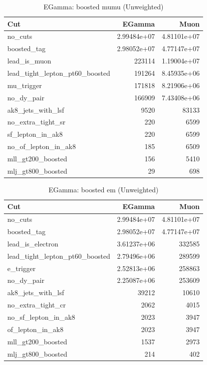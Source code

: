 \documentclass{article}
\begin{document}
\begin{table}[htbp]
\centering
\caption{EGamma: boosted mumu (Unweighted)}
\begin{tabular}{lrr}
\hline
Cut & EGamma & Muon \\
\hline
no\_cuts & 2.99484e+07 & 4.81101e+07 \\
boosted\_tag & 2.98052e+07 & 4.77147e+07 \\
lead\_is\_muon & 223114 & 1.19004e+07 \\
lead\_tight\_lepton\_pt60\_boosted & 191264 & 8.45935e+06 \\
mu\_trigger & 171818 & 8.21906e+06 \\
no\_dy\_pair & 166909 & 7.43408e+06 \\
ak8\_jets\_with\_lsf & 9520 & 83133 \\
no\_extra\_tight\_sr & 220 & 6599 \\
sf\_lepton\_in\_ak8 & 220 & 6599 \\
no\_of\_lepton\_in\_ak8 & 185 & 6509 \\
mll\_gt200\_boosted & 156 & 5410 \\
mlj\_gt800\_boosted & 29 & 698 \\
\hline
\end{tabular}
\end{table}

\begin{table}[htbp]
\centering
\caption{EGamma: boosted em (Unweighted)}
\begin{tabular}{lrr}
\hline
Cut & EGamma & Muon \\
\hline
no\_cuts & 2.99484e+07 & 4.81101e+07 \\
boosted\_tag & 2.98052e+07 & 4.77147e+07 \\
lead\_is\_electron & 3.61237e+06 & 332585 \\
lead\_tight\_lepton\_pt60\_boosted & 2.79496e+06 & 289599 \\
e\_trigger & 2.52813e+06 & 258863 \\
no\_dy\_pair & 2.25087e+06 & 253609 \\
ak8\_jets\_with\_lsf & 39212 & 10610 \\
no\_extra\_tight\_cr & 2062 & 4015 \\
no\_sf\_lepton\_in\_ak8 & 2023 & 3947 \\
of\_lepton\_in\_ak8 & 2023 & 3947 \\
mll\_gt200\_boosted & 1537 & 2973 \\
mlj\_gt800\_boosted & 214 & 402 \\
\hline
\end{tabular}
\end{table}
\end{document}
